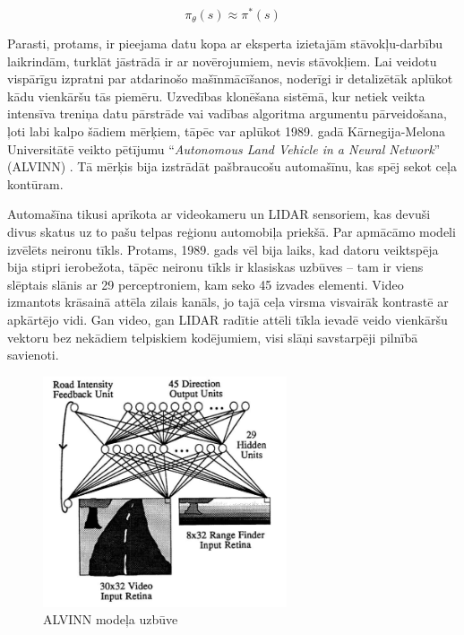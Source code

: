 \documentclass[12pt, a4paper]{article}
\numberwithin{equation}{section} %
\begin{document}
\begin{equation}
    \pi_{\theta}(s) \approx \pi^*(s)
\end{equation}

Parasti, protams, ir pieejama datu kopa ar eksperta izietajām stāvokļu-darbību laikrindām, turklāt jāstrādā ir ar novērojumiem, nevis stāvokļiem. Lai veidotu vispārīgu izpratni par atdarinošo mašīnmācīšanos, noderīgi ir detalizētāk aplūkot kādu vienkāršu tās piemēru. Uzvedības klonēšana sistēmā, kur netiek veikta intensīva treniņa datu pārstrāde vai vadības algoritma argumentu pārveidošana, ļoti labi kalpo šādiem mērķiem, tāpēc var aplūkot 1989. gadā Kārnegija-Melona Universitātē veikto pētījumu ``\textit{Autonomous Land Vehicle in a Neural Network}'' (ALVINN) \cite{pomerleau1989alvinn}. Tā mērķis bija izstrādāt pašbraucošu automašīnu, kas spēj sekot ceļa kontūram.

Automašīna tikusi aprīkota ar videokameru un LIDAR sensoriem, kas devuši divus skatus uz to pašu telpas reģionu automobiļa priekšā. Par apmācāmo modeli izvēlēts neironu tīkls. Protams, 1989. gads vēl bija laiks, kad datoru veiktspēja bija stipri ierobežota, tāpēc neironu tīkls ir klasiskas uzbūves -- tam ir viens slēptais slānis ar 29 perceptroniem, kam seko 45 izvades elementi. Video izmantots krāsainā attēla zilais kanāls, jo tajā ceļa virsma visvairāk kontrastē ar apkārtējo vidi. Gan video, gan LIDAR radītie attēli tīkla ievadē veido vienkāršu vektoru bez nekādiem telpiskiem kodējumiem, visi slāņi savstarpēji pilnībā savienoti.

\begin{figure}[t!]
    \centering
    \includegraphics[height=6.8cm,page=1]{../img/alvinn_architecture.png}
    \caption{ALVINN modeļa uzbūve \cite{pomerleau1989alvinn}}
\end{figure}
\end{document}
